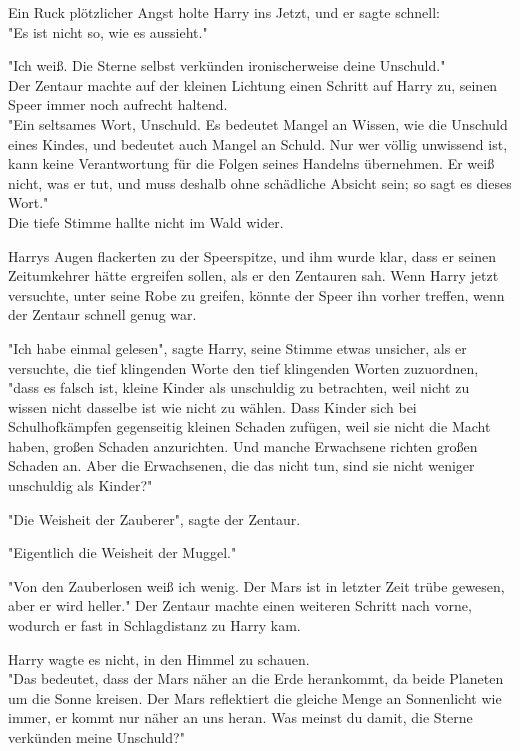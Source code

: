 {Ein Ruck plötzlicher Angst holte Harry ins Jetzt, und er sagte schnell:\\ "Es ist nicht so, wie es aussieht."

"Ich weiß. Die Sterne selbst verkünden ironischerweise deine Unschuld."\\ Der Zentaur machte auf der kleinen Lichtung einen Schritt auf Harry zu, seinen Speer immer noch aufrecht haltend.\\ "Ein seltsames Wort, Unschuld. Es bedeutet Mangel an Wissen, wie die Unschuld eines Kindes, und bedeutet auch Mangel an Schuld. Nur wer völlig unwissend ist, kann keine Verantwortung für die Folgen seines Handelns übernehmen. Er weiß nicht, was er tut, und muss deshalb ohne schädliche Absicht sein; so sagt es dieses Wort."\\ Die tiefe Stimme hallte nicht im Wald wider.

Harrys Augen flackerten zu der Speerspitze, und ihm wurde klar, dass er seinen Zeitumkehrer hätte ergreifen sollen, als er den Zentauren sah. Wenn Harry jetzt versuchte, unter seine Robe zu greifen, könnte der Speer ihn vorher treffen, wenn der Zentaur schnell genug war.

"Ich habe einmal gelesen", sagte Harry, seine Stimme etwas unsicher, als er versuchte, die tief klingenden Worte den tief klingenden Worten zuzuordnen,\\ "dass es falsch ist, kleine Kinder als unschuldig zu betrachten, weil nicht zu wissen nicht dasselbe ist wie nicht zu wählen. Dass Kinder sich bei Schulhofkämpfen gegenseitig kleinen Schaden zufügen, weil sie nicht die Macht haben, großen Schaden anzurichten. Und manche Erwachsene richten großen Schaden an. Aber die Erwachsenen, die das nicht tun, sind sie nicht weniger unschuldig als Kinder?"

"Die Weisheit der Zauberer", sagte der Zentaur.

"Eigentlich die Weisheit der Muggel."

"Von den Zauberlosen weiß ich wenig. Der Mars ist in letzter Zeit trübe gewesen, aber er wird heller." Der Zentaur machte einen weiteren Schritt nach vorne, wodurch er fast in Schlagdistanz zu Harry kam.

Harry wagte es nicht, in den Himmel zu schauen.\\ "Das bedeutet, dass der Mars näher an die Erde herankommt, da beide Planeten um die Sonne kreisen. Der Mars reflektiert die gleiche Menge an Sonnenlicht wie immer, er kommt nur näher an uns heran. Was meinst du damit, die Sterne verkünden meine Unschuld?"

}
